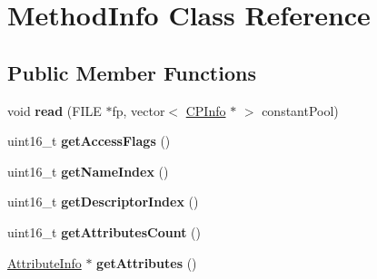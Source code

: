 \hypertarget{classMethodInfo}{}\section{Method\+Info Class Reference}
\label{classMethodInfo}
\subsection*{Public Member Functions}
\begin{DoxyCompactItemize}
\item 
void {\bfseries read} (F\+I\+LE $\ast$fp, vector$<$ \hyperlink{classCPInfo}{C\+P\+Info} $\ast$ $>$ constant\+Pool)\hypertarget{classMethodInfo_a1826a1018fb2ef8938dd9acdf6482005}{}\label{classMethodInfo_a1826a1018fb2ef8938dd9acdf6482005}

\item 
uint16\+\_\+t {\bfseries get\+Access\+Flags} ()\hypertarget{classMethodInfo_ac6424df17f502e99e751e92b07e19e8c}{}\label{classMethodInfo_ac6424df17f502e99e751e92b07e19e8c}

\item 
uint16\+\_\+t {\bfseries get\+Name\+Index} ()\hypertarget{classMethodInfo_ab9bf8f3034c0efbcd3c1e21a51c47669}{}\label{classMethodInfo_ab9bf8f3034c0efbcd3c1e21a51c47669}

\item 
uint16\+\_\+t {\bfseries get\+Descriptor\+Index} ()\hypertarget{classMethodInfo_afde1ae485a86705d2c705c3b7083eb81}{}\label{classMethodInfo_afde1ae485a86705d2c705c3b7083eb81}

\item 
uint16\+\_\+t {\bfseries get\+Attributes\+Count} ()\hypertarget{classMethodInfo_ab01117659c442f22cb7fac899c50073b}{}\label{classMethodInfo_ab01117659c442f22cb7fac899c50073b}

\item 
\hyperlink{classAttributeInfo}{Attribute\+Info} $\ast$ {\bfseries get\+Attributes} ()\hypertarget{classMethodInfo_a96d5d3396e50e481059e1e2f37cdad50}{}\label{classMethodInfo_a96d5d3396e50e481059e1e2f37cdad50}

\end{DoxyCompactItemize}
